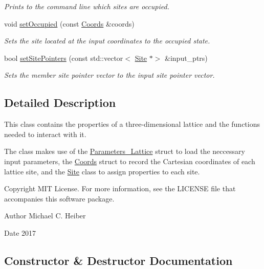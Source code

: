 \begin{DoxyCompactItemize}
\begin{DoxyCompactList}\small\item\em Prints to the command line which sites are occupied. \end{DoxyCompactList}\item 
void \hyperlink{class_lattice_a515b8bc548ef4a87c3495a7352a60399}{set\+Occupied} (const \hyperlink{struct_coords}{Coords} \&coords)
\begin{DoxyCompactList}\small\item\em Sets the site located at the input coordinates to the occupied state. \end{DoxyCompactList}\item 
bool \hyperlink{class_lattice_a59546ec4301871897ba5adfda1126741}{set\+Site\+Pointers} (const std\+::vector$<$ \hyperlink{class_site}{Site} $\ast$$>$ \&input\+\_\+ptrs)
\begin{DoxyCompactList}\small\item\em Sets the member site pointer vector to the input site pointer vector. \end{DoxyCompactList}\end{DoxyCompactItemize}


\subsection{Detailed Description}
This class contains the properties of a three-\/dimensional lattice and the functions needed to interact with it. 

The class makes use of the \hyperlink{struct_parameters___lattice}{Parameters\+\_\+\+Lattice} struct to load the neccessary input parameters, the \hyperlink{struct_coords}{Coords} struct to record the Cartesian coordinates of each lattice site, and the \hyperlink{class_site}{Site} class to assign properties to each site. \begin{DoxyCopyright}{Copyright}
M\+IT License. For more information, see the L\+I\+C\+E\+N\+SE file that accompanies this software package. 
\end{DoxyCopyright}
\begin{DoxyAuthor}{Author}
Michael C. Heiber 
\end{DoxyAuthor}
\begin{DoxyDate}{Date}
2017 
\end{DoxyDate}


\subsection{Constructor \& Destructor Documentation}
\mbox{\label{class_lattice_a70a5cebc3c0c5a0f609be0592e7cc117}} 
